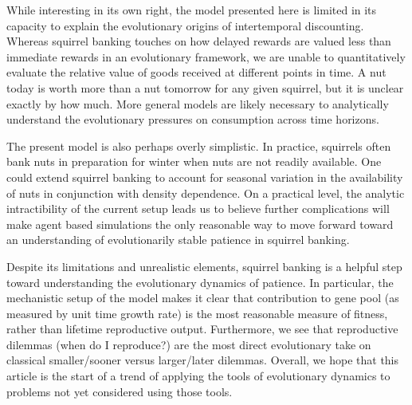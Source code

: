 \documentclass[titlepage, hidelinks, 12pt]{article}
\theoremstyle{plain}
\theoremstyle{remark}
\theoremstyle{definition}
\begin{document}
While interesting in its own right, the model presented here is limited in its capacity to explain the evolutionary origins of intertemporal
discounting. Whereas squirrel banking touches on how delayed rewards are
valued less than immediate rewards in an evolutionary framework, we are unable to quantitatively evaluate the relative value of goods received
at different points in time. A nut today is worth more than a nut tomorrow for any given squirrel, but it is unclear exactly by how much. More 
general models are likely necessary to analytically understand the evolutionary pressures on consumption across time horizons. 

The present model is also perhaps overly simplistic. 
In practice, squirrels often bank nuts in preparation for winter
when nuts are not readily available. 
One could extend squirrel banking to account for seasonal variation in the
availability of nuts in conjunction with density dependence. On a practical level, the analytic intractibility of the current
setup leads us to believe further complications will make agent based simulations the only reasonable way to move forward toward an understanding  
of evolutionarily stable patience in squirrel banking. 

Despite its limitations and unrealistic elements, squirrel banking is a helpful step toward understanding the evolutionary dynamics of patience. 
In particular, the mechanistic setup of the model makes it clear that contribution to gene pool (as measured by unit time growth rate) is the most
reasonable measure of fitness, rather than lifetime reproductive output. Furthermore, we see that reproductive dilemmas (when do I reproduce?) 
are the most direct evolutionary take on classical smaller/sooner versus larger/later dilemmas. Overall, we hope that this article is the start
of a trend of applying the tools of evolutionary dynamics to problems not yet considered using those tools. 



\newpage

{}
\end{document}
